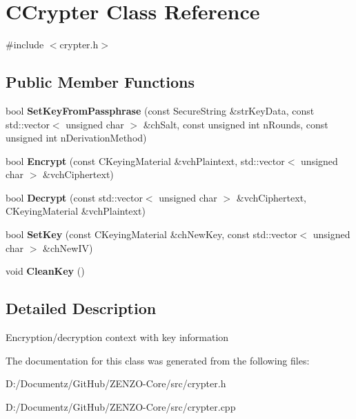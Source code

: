 \hypertarget{class_c_crypter}{}\section{C\+Crypter Class Reference}
\label{class_c_crypter}


{\ttfamily \#include $<$crypter.\+h$>$}

\subsection*{Public Member Functions}
\begin{DoxyCompactItemize}
\item 
\mbox{\label{class_c_crypter_a5368279e4a1549d3c1d15d8aa2179708}} 
bool {\bfseries Set\+Key\+From\+Passphrase} (const Secure\+String \&str\+Key\+Data, const std\+::vector$<$ unsigned char $>$ \&ch\+Salt, const unsigned int n\+Rounds, const unsigned int n\+Derivation\+Method)
\item 
\mbox{\label{class_c_crypter_a124fcd3021569a660ce2daa3391c8ea4}} 
bool {\bfseries Encrypt} (const C\+Keying\+Material \&vch\+Plaintext, std\+::vector$<$ unsigned char $>$ \&vch\+Ciphertext)
\item 
\mbox{\label{class_c_crypter_a4dbabed4975d4435d22c76deac43df7f}} 
bool {\bfseries Decrypt} (const std\+::vector$<$ unsigned char $>$ \&vch\+Ciphertext, C\+Keying\+Material \&vch\+Plaintext)
\item 
\mbox{\label{class_c_crypter_a0d948dd4796e2420e1dd9c1ddbf7974e}} 
bool {\bfseries Set\+Key} (const C\+Keying\+Material \&ch\+New\+Key, const std\+::vector$<$ unsigned char $>$ \&ch\+New\+IV)
\item 
\mbox{\label{class_c_crypter_a6910b4cff4ee40e33fbb3789dc12c139}} 
void {\bfseries Clean\+Key} ()
\end{DoxyCompactItemize}


\subsection{Detailed Description}
Encryption/decryption context with key information 

The documentation for this class was generated from the following files\+:\begin{DoxyCompactItemize}
\item 
D\+:/\+Documentz/\+Git\+Hub/\+Z\+E\+N\+Z\+O-\/\+Core/src/crypter.\+h\item 
D\+:/\+Documentz/\+Git\+Hub/\+Z\+E\+N\+Z\+O-\/\+Core/src/crypter.\+cpp\end{DoxyCompactItemize}
